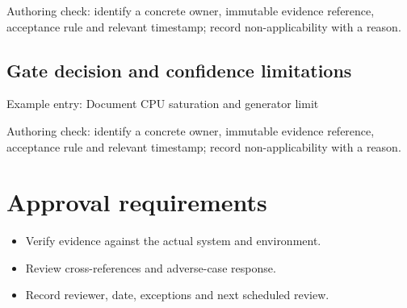 \documentclass[10pt,letterpaper]{article}
\begin{document}
Authoring check: identify a concrete owner, immutable evidence reference, acceptance rule and relevant timestamp; record non-applicability with a reason.


\subsection{Gate decision and confidence limitations}
Example entry: Document CPU saturation and generator limit

Authoring check: identify a concrete owner, immutable evidence reference, acceptance rule and relevant timestamp; record non-applicability with a reason.


\section{Approval requirements}
\begin{itemize}
\item Verify evidence against the actual system and environment.
\item Review cross-references and adverse-case response.
\item Record reviewer, date, exceptions and next scheduled review.
\end{itemize}
\end{document}
